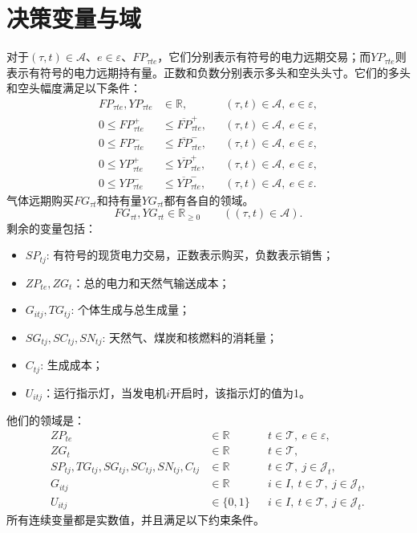 \documentclass[11pt,a4paper]{article}
\begin{document}
\section*{决策变量与域}
对于$(\tau,t)\in\mathcal A$、$e\in\varepsilon$、$FP_{\tau te}$，它们分别表示有符号的电力远期交易；而$YP_{\tau te}$则表示有符号的电力远期持有量。正数和负数分别表示多头和空头头寸。它们的多头和空头幅度满足以下条件：
\begin{align*}
FP_{\tau te},YP_{\tau te}&\in\mathbb R,
&& (\tau,t)\in\mathcal A,\ e\in\varepsilon,\\
0\le FP_{\tau te}^{+}&\le\overline{FP}_{\tau te}^{+},
&& (\tau,t)\in\mathcal A,\ e\in\varepsilon,\\
0\le FP_{\tau te}^{-}&\le\overline{FP}_{\tau te}^{-},
&& (\tau,t)\in\mathcal A,\ e\in\varepsilon,\\
0\le YP_{\tau te}^{+}&\le\overline{YP}_{\tau te}^{+},
&& (\tau,t)\in\mathcal A,\ e\in\varepsilon,\\
0\le YP_{\tau te}^{-}&\le\overline{YP}_{\tau te}^{-},
&& (\tau,t)\in\mathcal A,\ e\in\varepsilon.
\end{align*}
气体远期购买$FG_{\tau t}$和持有量$YG_{\tau t}$都有各自的领域。
\[
FG_{\tau t},YG_{\tau t}\in\mathbb R_{\ge0}
\qquad ((\tau,t)\in\mathcal A).
\]
剩余的变量包括：
\begin{itemize}
\item $SP_{tj}$: 有符号的现货电力交易，正数表示购买，负数表示销售；
\item $ZP_{te},ZG_t$：总的电力和天然气输送成本；
\item $G_{itj},TG_{tj}$: 个体生成与总生成量；
\item $SG_{tj},SC_{tj},SN_{tj}$: 天然气、煤炭和核燃料的消耗量；
\item $C_{tj}$: 生成成本；
\item $U_{itj}$：运行指示灯，当发电机$i$开启时，该指示灯的值为1。
\end{itemize}
他们的领域是：
\begin{align*}
ZP_{te}&\in\mathbb R
&&t\in\mathcal T,\ e\in\varepsilon,\\
ZG_t&\in\mathbb R
&&t\in\mathcal T,\\
SP_{tj},TG_{tj},SG_{tj},SC_{tj},SN_{tj},C_{tj}&\in\mathbb R
&&t\in\mathcal T,\ j\in\mathcal J_t,\\
G_{itj}&\in\mathbb R
&&i\in I,\ t\in\mathcal T,\ j\in\mathcal J_t,\\
U_{itj}&\in\{0,1\}
&&i\in I,\ t\in\mathcal T,\ j\in\mathcal J_t.
\end{align*}
所有连续变量都是实数值，并且满足以下约束条件。
\end{document}

